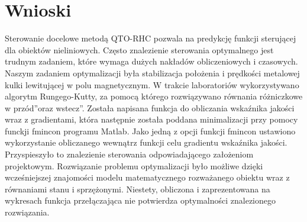 \section{Wnioski}

Sterowanie docelowe metodą QTO-RHC pozwala na predykcję funkcji sterującej dla obiektów nieliniowych. 
Często znalezienie sterowania optymalnego jest trudnym zadaniem, które wymaga dużych nakładów 
obliczeniowych i czasowych. Naszym zadaniem optymalizacji była stabilizacja położenia i prędkości metalowej
kulki lewitującej w polu magnetycznym. W trakcie laboratoriów wykorzystywano algorytm Rungego-Kutty, za 
pomocą którego rozwiązywano równania różniczkowe \quotedblbase w przód\textquotedblright oraz \quotedblbase wstecz\textquotedblright. Została napisana funkcja do
obliczania wskaźnika jakości wraz z gradientami, która następnie została poddana minimalizacji przy pomocy
funckji fmincon programu Matlab. Jako jedną z opcji funkcji fmincon ustawiono wykorzystanie obliczanego 
wewnątrz funkcji celu gradientu wskaźnika jakości. Przyspieszyło to znalezienie sterowania odpowiadającego
założeniom projektowym. Rozwiązanie problemu optymalizacji było możliwe dzięki wcześniejszej znajomości
modelu matematycznego rozważanego obiektu wraz z równaniami stanu i sprzężonymi. Niestety, obliczona i zaprezentowana na wykresach funkcja przełączająca nie potwierdza optymalności znalezionego rozwiązania.
